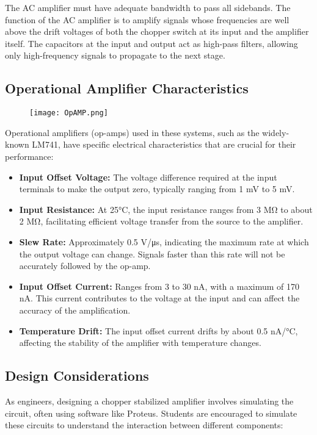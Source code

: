 \documentclass[a4paper,9pt,twoside,openany,twocolumn]{memoir}
\begin{document}
The AC amplifier must have adequate bandwidth to pass all sidebands. The function of the AC amplifier is to amplify signals whose frequencies are well above the drift voltages of both the chopper switch at its input and the amplifier itself. The capacitors at the input and output act as high-pass filters, allowing only high-frequency signals to propagate to the next stage.

\subsection{Operational Amplifier Characteristics}
\begin{figure}[h!]
    \centering
    \texttt{[image: OpAMP.png]} %

\end{figure}

Operational amplifiers (op-amps) used in these systems, such as the widely-known LM741, have specific electrical characteristics that are crucial for their performance:
\begin{itemize}
    \item \textbf{Input Offset Voltage:} The voltage difference required at the input terminals to make the output zero, typically ranging from 1 mV to 5 mV.
    \item \textbf{Input Resistance:} At 25°C, the input resistance ranges from 3 MΩ to about 2 MΩ, facilitating efficient voltage transfer from the source to the amplifier.
    \item \textbf{Slew Rate:} Approximately 0.5 V/μs, indicating the maximum rate at which the output voltage can change. Signals faster than this rate will not be accurately followed by the op-amp.
    \item \textbf{Input Offset Current:} Ranges from 3 to 30 nA, with a maximum of 170 nA. This current contributes to the voltage at the input and can affect the accuracy of the amplification.
    \item \textbf{Temperature Drift:} The input offset current drifts by about 0.5 nA/°C, affecting the stability of the amplifier with temperature changes.
\end{itemize}

\subsection{Design Considerations}
As engineers, designing a chopper stabilized amplifier involves simulating the circuit, often using software like Proteus. Students are encouraged to simulate these circuits to understand the interaction between different components:
\end{document}

